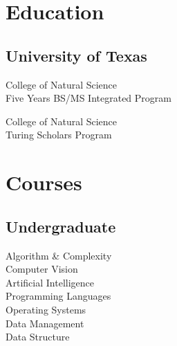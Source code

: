 \documentclass[]{deedy-resume-openfont}
\begin{document}
%
%

%
%



%
%

\begin{minipage}[t]{0.33\textwidth} 


\section{Education} 

\subsection{University of Texas}

\vspace{\topsep} %

College of Natural Science \\
Five Years BS/MS Integrated Program \\
\sectionsep

College of Natural Science \\
Turing Scholars Program \\
\sectionsep



\section{Courses}

\subsection{Undergraduate}
Algorithm \& Complexity \\
Computer Vision \\
Artificial Intelligence \\
Programming Languages \\
Operating Systems \\
Data Management \\
Data Structure \\


\end{minipage}
\end{document}

